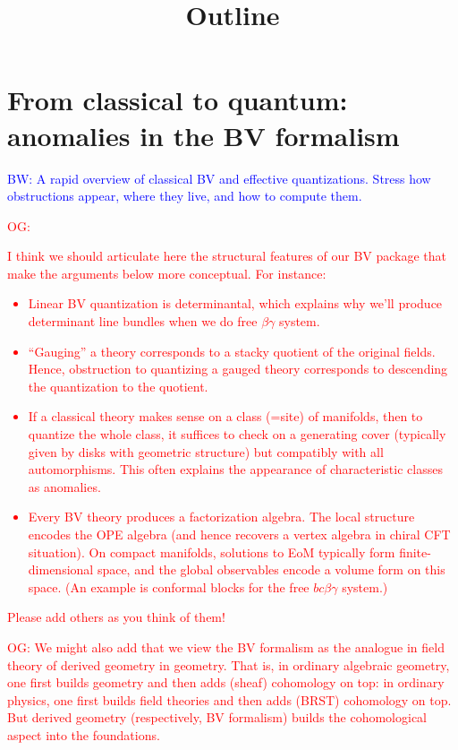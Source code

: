 \documentclass[10pt]{amsart}
\title{Outline}
\def\brian{\textcolor{blue}{BW: }\textcolor{blue}}
\def\owen{\textcolor{red}{OG: }\textcolor{red}}
\begin{document}
\maketitle

\section{From classical to quantum: anomalies in the BV formalism}

\brian{A rapid overview of classical BV and effective quantizations. Stress how obstructions appear, where they live, and how to compute them.}

\owen{I think we should articulate here the structural features of our BV package that make the arguments below more conceptual. For instance:
\begin{itemize}
\item Linear BV quantization is determinantal, which explains why we'll produce determinant line bundles when we do free $\beta\gamma$ system.
\item ``Gauging'' a theory corresponds to a stacky quotient of the original fields. Hence, obstruction to quantizing a gauged theory corresponds to descending the quantization to the quotient.
\item If a classical theory makes sense on a class (=site) of manifolds, then to quantize the whole class, it suffices to check on a generating cover (typically given by disks with geometric structure) but compatibly with all automorphisms. This often explains the appearance of characteristic classes as anomalies.
\item Every BV theory produces a factorization algebra. The local structure encodes the OPE algebra (and hence recovers a vertex algebra in chiral CFT situation). On compact manifolds, solutions to EoM typically form finite-dimensional space, and the global observables encode a volume form on this space. (An example is conformal blocks for the free $bc\beta\gamma$ system.)
\end{itemize}
Please add others as you think of them!}

\owen{We might also add that we view the BV formalism as the analogue in field theory of derived geometry in geometry. That is, in ordinary algebraic geometry, one first builds geometry and then adds (sheaf) cohomology on top: in ordinary physics, one first builds field theories and then adds (BRST) cohomology on top. But derived geometry (respectively, BV formalism) builds the cohomological aspect into the foundations.}
\end{document}
